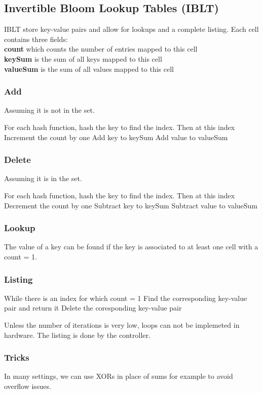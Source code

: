 \documentclass[a4paper, fontsize=8pt, landscape, DIV=1]{scrartcl}
\begin{document}
\begin{multicols*}{4}
  \subsection{Invertible Bloom Lookup Tables (IBLT)}
  IBLT store key-value pairs and allow for lookups and a complete listing. Each cell
  contains three fields: \\
  \textbf{count} which counts the number of entries mapped to this cell\\
  \textbf{keySum} is the sum of all keys mapped to this cell\\
  \textbf{valueSum} is the sum of all values mapped to this cell

  \subsubsection{Add}
  Assuming it is not in the set.
  \begin{outline}
   \1 For each hash function, hash the key to find the index. Then at this index
    \2 Increment the count by one
    \2 Add key to keySum
    \2 Add value to valueSum
  \end{outline}

  \subsubsection{Delete}
  Assuming it is in the set.
  \begin{outline}
   \1 For each hash function, hash the key to find the index. Then at this index
    \2 Decrement the count by one
    \2 Subtract key to keySum
    \2 Subtract value to valueSum
  \end{outline}

  \subsubsection{Lookup}
  The value of a key can be found if the key is associated to at least one 
  cell with a count = 1.

  \subsubsection{Listing}
  \begin{outline}
   \1 While there is an index for which count = 1
    \2 Find the corresponding key-value pair and return it
    \2 Delete the coresponding key-value pair
  \end{outline}
  Unless the number of iterations is very low, loops can not be implemeted 
  in hardware. The listing is done by the controller.

  \subsubsection{Tricks}
  In many settings, we can use XORs in place of sums for example to avoid
  overflow issues.

  \vfill\null
  \pagebreak
  \end{multicols*}
\end{document}
